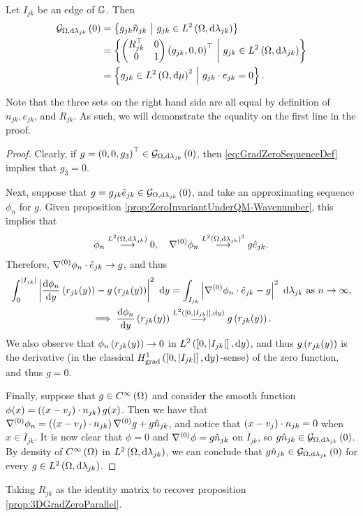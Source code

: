 \begin{prop} \label{prop:3DGradZeroRotated}
	Let $I_{jk}$ be an edge of $\mathbb{G}$.
	Then
	\begin{align*}
		\mathcal{G}_{ \Omega, \mathrm{d}\lambda_{jk}}\left( 0 \right) 
		&= \left\{  g_{jk}\hat{n}_{jk} \ \middle\vert \  g_{jk}\in L^{2}\left( \Omega,\mathrm{d}\lambda_{jk} \right)  \right\} \\
		&= \left\{  \begin{pmatrix} R_{jk}^{\top} & 0 \\ 0 & 1 \end{pmatrix} \left( g_{jk},0,0 \right)^\top \ \middle\vert \  g_{jk}\in L^{2}\left( \Omega,\mathrm{d}\lambda_{jk} \right)  \right\} \\
		&= \left\{  g_{jk}\in L^{2}\left( \Omega,\mathrm{d}\mu \right)^2 \ \middle\vert \  g_{jk}\cdot e_{jk} = 0  \right\}.
	\end{align*}
\end{prop}
Note that the three sets on the right hand side are all equal by definition of $n_{jk}, e_{jk}$, and $R_{jk}$.
As such, we will demonstrate the equality on the first line in the proof. 
\begin{proof}
	Clearly, if $g=\left( 0,0,g_3 \right)^\top\in\mathcal{G}_{ \Omega, \mathrm{d}\lambda_{jk}}\left( 0 \right)$, then \eqref{eq:GradZeroSequenceDef} implies that $g_3=0$.
	
	Next, suppose that $g=g_{jk}\hat{e}_{jk}\in\mathcal{G}_{ \Omega, \mathrm{d}\lambda_{jk}}\left( 0 \right)$, and take an approximating sequence $\phi_n$ for $g$.
	Given proposition \ref{prop:ZeroInvariantUnderQM-Wavenumber}, this implies that
	\begin{align*}
		\phi_n\overset{L^{2}\left( \Omega,\mathrm{d}\lambda_{jk} \right)}{\longrightarrow}0, \quad
		\nabla^{(0)}\phi_n \overset{L^{2}\left( \Omega,\mathrm{d}\lambda_{jk} \right)^3}{\longrightarrow} g\hat{e}_{jk}.
	\end{align*}
	Therefore, $\nabla^{(0)}\phi_n\cdot\hat{e}_{jk}\rightarrow g$, and thus
	\begin{align*}
		\int_0^{\left\lvert I_{jk} \right\rvert} \left\lvert \dfrac{\mathrm{d}\phi_n}{\mathrm{d}y}\left( r_{jk}(y) \right) - g\left( r_{jk}(y) \right)  \right\rvert^2 \ \mathrm{d} y
		&= \int_{I_{jk}} \left\lvert \nabla^{(0)}\phi_n\cdot\hat{e}_{jk} - g \right\rvert^2  \ \mathrm{d}\lambda_{jk} \ \text{as} \ n \rightarrow\infty, \\
		\implies \dfrac{\mathrm{d}\phi_n}{\mathrm{d}y}\left( r_{jk}(y) \right) &\overset{L^{2}\left( \left[ 0,\left\lvert I_{jk} \right\rvert \right],\mathrm{d}y \right)}{\longrightarrow} g\left( r_{jk}(y) \right).
	\end{align*}
	We also observe that $\phi_n\left( r_{jk}(y) \right)\rightarrow 0$ in $L^{2}\left( \left[ 0,\left\lvert I_{jk} \right\rvert \right],\mathrm{d}y \right)$, and thus $g\left( r_{jk}(y) \right)$ is the derivative (in the classical $H^1_\mathrm{grad}\left( \left[ 0,\left\lvert I_{jk} \right\rvert \right], \mathrm{d}y \right)$-sense) of the zero function, and thus $g=0$.
	
	Finally, suppose that $g\in C^{\infty}\left( \Omega \right)$ and consider the smooth function $\phi(x) = \left( \left( x-v_j \right)\cdot n_{jk} \right)g(x)$.
	Then we have that $\nabla^{(0)}\phi_n = \left( \left( x-v_j \right)\cdot n_{jk} \right)\nabla^{(0)} g + g\hat{n}_{jk}$, and notice that $\left( x-v_j \right)\cdot n_{jk}	=0$ when $x\in I_{jk}$.
	It is now clear that $\phi=0$ and $\nabla^{(0)}\phi = g\hat{n}_{jk}$ on $I_{jk}$, so $g\hat{n}_{jk}\in\mathcal{G}_{ \Omega, \mathrm{d}\lambda_{jk}}\left( 0 \right)$.
	By density of $C^{\infty}\left( \Omega \right)$ in $L^{2}\left( \Omega,\mathrm{d}\lambda_{jk} \right)$, we can conclude that $g\hat{n}_{jk}\in\mathcal{G}_{ \Omega, \mathrm{d}\lambda_{jk}}\left( 0 \right)$ for every $g\in L^{2}\left( \Omega,\mathrm{d}\lambda_{jk} \right)$.
\end{proof}
Taking $R_{jk}$ as the identity matrix to recover proposition \ref{prop:3DGradZeroParallel}.

